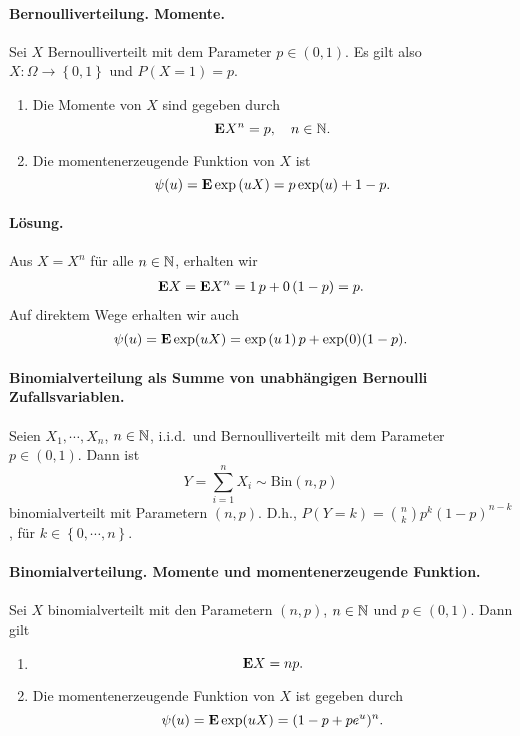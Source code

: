 \paragraph{Bernoulliverteilung. Momente. }
Sei $X$ Bernoulliverteilt mit dem Parameter $p \in \left( 0,1 \right)$. Es gilt also
$X: \Omega \to \left\{ 0,1 \right\}$ und $P(X=1)=p$. 
\begin{enumerate}
    \item Die Momente von $X$ sind gegeben durch
        \begin{equation*}
            \mathbf{E} X^n = p, \quad n\in\mathbb N.
        \end{equation*}
    \item Die momentenerzeugende Funktion von $X$ ist 
        \begin{equation*}
            \psi(u) = \mathbf{E} \exp \left( u X \right) = p\exp (u)+1-p.
        \end{equation*} 
\end{enumerate}
\paragraph*{Lösung.} Aus $X = X^n$ für alle $n\in \mathbb N$, erhalten wir  
\begin{align*}
    \mathbf{E} X = \mathbf{E} X^n = 1\, p + 0\, (1-p) = p.
\end{align*}
Auf direktem Wege erhalten wir auch
\begin{equation*}
    \psi(u) = \mathbf{E} \exp (uX) = \exp\left( u\, 1 \right)p + \exp(0)(1-p).
\end{equation*}



\paragraph{Binomialverteilung als Summe von unabhängigen Bernoulli Zufallsvariablen.}
Seien $X_1, \cdots, X_n$, $n\in\mathbb N$, i.i.d.\ und Bernoulliverteilt mit dem Parameter $p\in (0,1)$. 
Dann ist
\begin{equation*}
    Y=\sum_{i=1}^{n} X_i \sim \text{Bin}(n,p)
\end{equation*}
binomialverteilt mit Parametern $(n,p)$. D.h., $P(Y = k) = \binom{n}{k}  p^{k}(1-p)^{n-k}$, 
für $k\in \left\{ 0, \cdots, n \right\}$.

\paragraph{Binomialverteilung. Momente und momentenerzeugende Funktion.}
Sei $X$ binomialverteilt mit den Parametern $(n,p)$, $n\in\mathbb N$ und $p\in(0,1)$. Dann gilt
\begin{enumerate}
    \item \begin{equation*}
            \mathbf{E} X = np. 
        \end{equation*}
    \item Die momentenerzeugende Funktion von $X$ ist gegeben durch
        \begin{equation*}
            \psi(u) = \mathbf{E} \exp( uX) = (1 -p + p e^u)^{n}.
        \end{equation*}
\end{enumerate}
